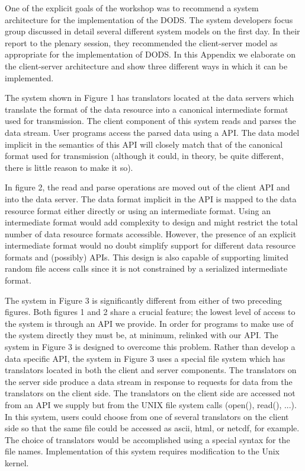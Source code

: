 One of the explicit goals of the workshop was to recommend a system
architecture for the implementation of the DODS. The system developers focus
group discussed in detail several different system models on the first day.
In their report to the plenary session, they recommended the client-server
model as appropriate for the implementation of DODS. In this Appendix we
elaborate on the client-server architecture and show three different ways in
which it can be implemented.

The system shown in Figure 1 has translators located at the data servers
which translate the format of the data resource into a canonical intermediate
format used for transmission. The client component of this system reads and
parses the data stream. User programs access the parsed data using a
API. The data model implicit in the semantics of this API will closely match
that of the canonical format used for transmission (although it could, in
theory, be quite different, there is little reason to make it so).

In figure 2, the read and parse operations are moved  out of the client API
and into the data server. The data format implicit in the API is mapped to
the data resource format either directly or using an intermediate format.
Using an intermediate format would add complexity to design and might
restrict the total number of data resource formats accessible. However, the
presence of an explicit intermediate format would no doubt simplify support
for different data resource formats and (possibly) APIs. This design is also
capable of supporting limited random file access calls since it is not
constrained by a serialized intermediate format.

The system in Figure 3 is significantly different from either of two
preceding figures. Both figures 1 and 2 share a crucial feature; the
lowest level of access to the system is through an API we provide. In order
for programs to make use of the system directly they must be, at minimum,
relinked with our API. The system in Figure 3 is designed to overcome this
problem. Rather than develop a data specific API, the system in Figure 3 uses
a special file system which has translators located in both the client and
server components. The translators on the server side produce a data stream
in response to requests for data from the translators on the client side. The
translators on the client side are accessed not from an API we supply but
from the UNIX file system calls (open(), read(), ...). In this system, users
could choose from one of several translators on the client side so that the
same file could be accessed as ascii, html, or netcdf, for example. The
choice of translators would be accomplished using a special syntax for the
file names.  Implementation of this system requires modification to the Unix
kernel.

